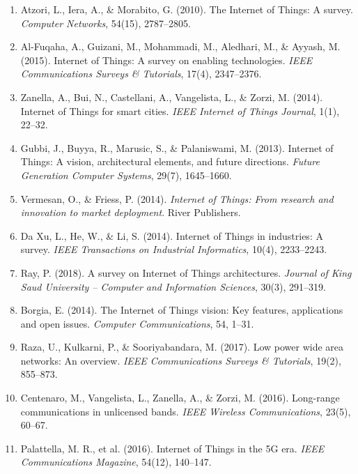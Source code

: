 \documentclass[twocolumn, 10pt]{article}
\begin{document}
\begin{enumerate}

\item Atzori, L., Iera, A., \& Morabito, G. (2010). The Internet of Things: A survey. \textit{Computer Networks}, 54(15), 2787--2805.

\item Al-Fuqaha, A., Guizani, M., Mohammadi, M., Aledhari, M., \& Ayyash, M. (2015). Internet of Things: A survey on enabling technologies. \textit{IEEE Communications Surveys \& Tutorials}, 17(4), 2347--2376.

\item Zanella, A., Bui, N., Castellani, A., Vangelista, L., \& Zorzi, M. (2014). Internet of Things for smart cities. \textit{IEEE Internet of Things Journal}, 1(1), 22--32.

\item Gubbi, J., Buyya, R., Marusic, S., \& Palaniswami, M. (2013). Internet of Things: A vision, architectural elements, and future directions. \textit{Future Generation Computer Systems}, 29(7), 1645--1660.

\item Vermesan, O., \& Friess, P. (2014). \textit{Internet of Things: From research and innovation to market deployment}. River Publishers.

\item Da Xu, L., He, W., \& Li, S. (2014). Internet of Things in industries: A survey. \textit{IEEE Transactions on Industrial Informatics}, 10(4), 2233--2243.

\item Ray, P. (2018). A survey on Internet of Things architectures. \textit{Journal of King Saud University – Computer and Information Sciences}, 30(3), 291--319.

\item Borgia, E. (2014). The Internet of Things vision: Key features, applications and open issues. \textit{Computer Communications}, 54, 1--31.

\item Raza, U., Kulkarni, P., \& Sooriyabandara, M. (2017). Low power wide area networks: An overview. \textit{IEEE Communications Surveys \& Tutorials}, 19(2), 855--873.

\item Centenaro, M., Vangelista, L., Zanella, A., \& Zorzi, M. (2016). Long-range communications in unlicensed bands. \textit{IEEE Wireless Communications}, 23(5), 60--67.

\item Palattella, M. R., et al. (2016). Internet of Things in the 5G era. \textit{IEEE Communications Magazine}, 54(12), 140--147.


\end{enumerate}
\end{document}
